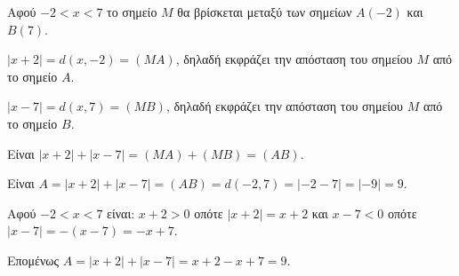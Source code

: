 
\begin{alist}
\item Αφού $-2 < x < 7$ το σημείο $M$ θα βρίσκεται μεταξύ των σημείων $A(-2)$ και $B(7)$.

\begin{rlist}
\item $|x + 2| = d(x, -2) = (MA)$, δηλαδή εκφράζει την απόσταση του σημείου $M$ από το σημείο $A$.
\item $|x - 7| = d(x, 7) = (MB)$, δηλαδή εκφράζει την απόσταση του σημείου $M$ από το σημείο $B$.
\end{rlist}

\item Είναι $|x + 2| + |x - 7| = (MA) + (MB) = (AB)$.

\item Είναι $A = |x + 2| + |x - 7| = (AB) = d(-2, 7) = |-2 - 7| = |-9| = 9$.

\item Αφού $-2 < x < 7$ είναι:
$x + 2 > 0$ οπότε $|x + 2| = x + 2$ και
$x - 7 < 0$ οπότε $|x - 7| = -(x - 7) = -x + 7$.

Επομένως $A = |x + 2| + |x - 7| = x + 2 - x + 7 = 9$.
\end{alist}

